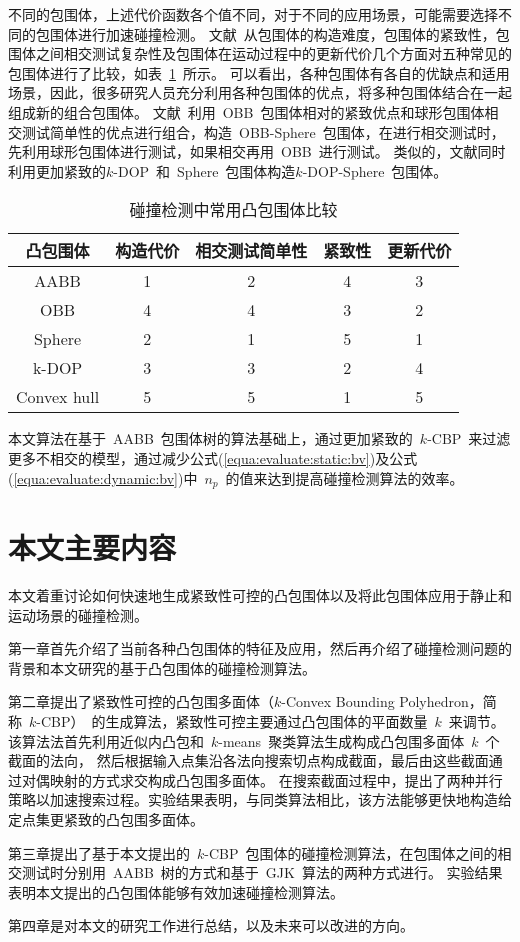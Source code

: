 不同的包围体，上述代价函数各个值不同，对于不同的应用场景，可能需要选择不同的包围体进行加速碰撞检测。
文献~从包围体的构造难度，包围体的紧致性，包围体之间相交测试复杂性及包围体在运动过程中的更新代价几个方面对五种常见的包围体进行了比较，如表~\ref{lbl:table:bv-comp}~所示。
可以看出，各种包围体有各自的优缺点和适用场景，因此，很多研究人员充分利用各种包围体的优点，将多种包围体结合在一起组成新的组合包围体。
文献~利用~OBB~包围体相对的紧致优点和球形包围体相交测试简单性的优点进行组合，构造~OBB-Sphere~包围体，在进行相交测试时，先利用球形包围体进行测试，如果相交再用~OBB~进行测试。
类似的，文献同时利用更加紧致的$k$-DOP~和~Sphere~包围体构造$k$-DOP-Sphere~包围体。

\begin{table}[htbp]
\centering
\caption{碰撞检测中常用凸包围体比较}
\begin{tabular}{ccccc}
\toprule[1.5pt]
凸包围体 & 构造代价 & 相交测试简单性 & 紧致性 & 更新代价\\
\midrule[1.0pt]
AABB   & 1 & 2 & 4 & 3\\
OBB    & 4 & 4 & 3 & 2\\
Sphere & 2 & 1 & 5 & 1\\
k-DOP  & 3 & 3 & 2 & 4\\
Convex hull & 5 & 5 & 1 & 5 \\
\bottomrule[1.5pt]
\end{tabular}
\label{lbl:table:bv-comp}
\end{table}

本文算法在基于~AABB~包围体树的算法基础上，通过更加紧致的~$k$-CBP~来过滤更多不相交的模型，通过减少公式(\ref{equa:evaluate:static:bv})及公式(\ref{equa:evaluate:dynamic:bv})中~$n_p$~的值来达到提高碰撞检测算法的效率。

\section{本文主要内容}
\label{sec:structure}
本文着重讨论如何快速地生成紧致性可控的凸包围体以及将此包围体应用于静止和运动场景的碰撞检测。

第一章首先介绍了当前各种凸包围体的特征及应用，然后再介绍了碰撞检测问题的背景和本文研究的基于凸包围体的碰撞检测算法。

第二章提出了紧致性可控的凸包围多面体（$k$-Convex Bounding Polyhedron，简称~$k$-CBP）~的生成算法，紧致性可控主要通过凸包围体的平面数量~$k$~来调节。
该算法法首先利用近似内凸包和~$k$-means~聚类算法生成构成凸包围多面体~$k$~个截面的法向，
然后根据输入点集沿各法向搜索切点构成截面，最后由这些截面通过对偶映射的方式求交构成凸包围多面体。
在搜索截面过程中，提出了两种并行策略以加速搜索过程。实验结果表明，与同类算法相比，该方法能够更快地构造给定点集更紧致的凸包围多面体。

第三章提出了基于本文提出的~$k$-CBP~包围体的碰撞检测算法，在包围体之间的相交测试时分别用~AABB~树的方式和基于~GJK~算法的两种方式进行。
实验结果表明本文提出的凸包围体能够有效加速碰撞检测算法。

第四章是对本文的研究工作进行总结，以及未来可以改进的方向。

